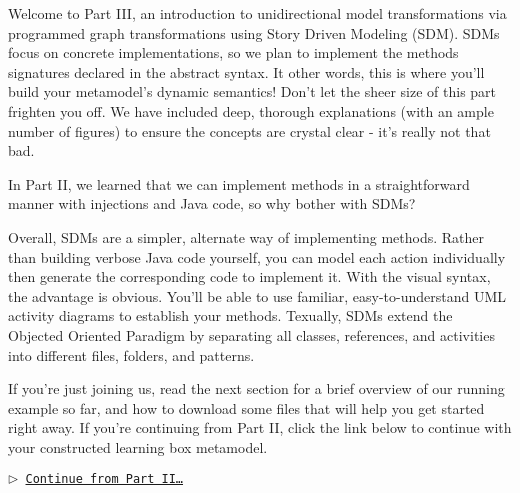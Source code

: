 \genHeader
{}

Welcome to Part III, an introduction to unidirectional model transformations via programmed graph transformations using Story Driven Modeling (SDM).
SDMs focus on concrete implementations, so we plan to implement the methods signatures declared in the abstract syntax. It other words, this is where you'll
build your metamodel's dynamic semantics! Don't let the sheer size of this part frighten you off. We have included deep, thorough explanations (with an ample
number of figures) to ensure the concepts are crystal clear - it's really not that bad.

In Part II, we learned that we can implement methods in a straightforward manner with injections and Java code, so why bother with SDMs? 

Overall, SDMs are a simpler, alternate way of implementing methods. Rather than building verbose Java code yourself, you can model each action individually then
generate the corresponding code to implement it. With the visual syntax, the advantage is obvious. You'll be able to use familiar, easy-to-understand UML
activity diagrams to establish your methods. Texually, SDMs extend the Objected Oriented Paradigm by separating all classes, references, and activities into
different files, folders, and patterns.

If you're just joining us, read the next section for a brief overview of our running example so far, and how to download some files that will help you get
started right away. If you're continuing from Part II, click the link below to continue with your constructed learning box metamodel.

\begin{center}\texttt{$\triangleright$ \hyperlink{explanation}{Continue from Part II\ldots}}\end{center}
